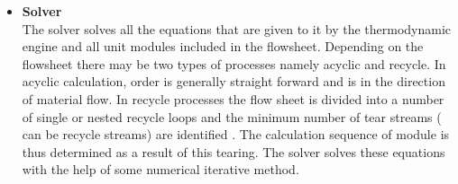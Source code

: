 \documentclass[12pt]{report}
\begin{document}
\begin{itemize}
\item{\textbf{Solver}} \\
The solver solves all the equations that are given to it by the thermodynamic engine and all unit modules included in the flowsheet. Depending on the flowsheet there may be two types of processes namely acyclic and recycle. In acyclic calculation, order is generally straight forward and is in the direction of material flow. In recycle processes the flow sheet is divided into a number of single or nested recycle loops and the minimum number of tear streams ( can be recycle streams) are identified . The calculation sequence of module is thus determined as a result of this tearing. The solver solves these equations with the help of some numerical iterative method.
\end{itemize}
\end{document}
